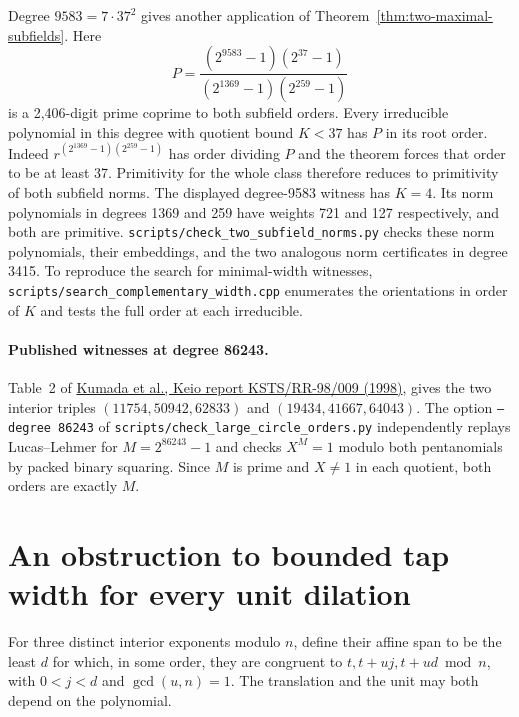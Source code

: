 \documentclass[11pt]{article}
\begin{document}
Degree \(9583=7\cdot37^2\) gives another application of
Theorem~\ref{thm:two-maximal-subfields}. Here
\[
 P=\frac{(2^{9583}-1)(2^{37}-1)}{(2^{1369}-1)(2^{259}-1)}
\]
is a 2,406-digit prime coprime to both subfield orders. Every
irreducible polynomial in this degree with quotient bound \(K<37\)
has \(P\) in its root order. Indeed \(r^{(2^{1369}-1)(2^{259}-1)}\)
has order dividing \(P\) and the theorem forces that order to be
at least 37. Primitivity for the whole class therefore reduces to
primitivity of both subfield norms. The displayed degree-9583
witness has \(K=4\). Its norm polynomials in degrees 1369 and 259
have weights 721 and 127 respectively, and both are primitive.
\nolinkurl{scripts/check_two_subfield_norms.py} checks these norm
polynomials, their embeddings, and the two analogous norm certificates
in degree 3415. To reproduce the search for minimal-width witnesses,
\nolinkurl{scripts/search_complementary_width.cpp} enumerates the
orientations in order of \(K\) and tests the full order at each
irreducible.

\paragraph{Published witnesses at degree 86243.}
Table~2 of \href{https://www.math.keio.ac.jp/wp-content/uploads/2022/03/98009.pdf}
{Kumada et al., Keio report KSTS/RR-98/009 (1998)}, gives the two
interior triples \((11754,50942,62833)\) and \((19434,41667,64043)\).
The option \texttt{--degree 86243} of
\nolinkurl{scripts/check_large_circle_orders.py} independently replays
Lucas--Lehmer for \(M=2^{86243}-1\) and checks \(X^M=1\) modulo
both pentanomials by packed binary squaring. Since \(M\) is prime
and \(X\ne1\) in each quotient, both orders are exactly \(M\).

\section{An obstruction to bounded tap width for every unit dilation}
\label{sec:affine-tap-span}

For three distinct interior exponents modulo \(n\), define their
affine span to be the least \(d\) for which, in some order, they
are congruent to \(t,t+uj,t+ud\bmod n\), with \(0<j<d\) and
\(\gcd(u,n)=1\). The translation and the unit may both depend on
the polynomial.
\end{document}
